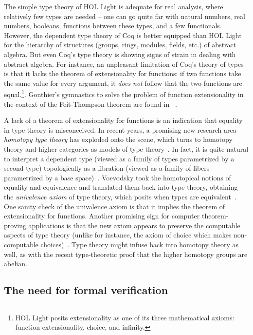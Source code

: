 \documentclass{llncs}
\begin{document}
The simple type theory of HOL Light is adequate for real
analysis, where relatively few types are needed -- one can go quite
far with natural numbers, real numbers, booleans, functions between
these types, and a few functionals.  However, the dependent type
theory of Coq is better equipped than HOL Light for the hierarchy of
structures (groups, rings, modules, fields, etc.) of abstract algebra.
But even Coq's type theory is showing signs of strain in dealing with
abstract algebra.  For instance, an unpleasant limitation of Coq's
theory of types is that it lacks the theorem of extensionality for
functions: if two functions take the same value for every argument, it
{\it does not} follow that the two functions are equal.\footnote{HOL Light
  posits extensionality as one of its three mathematical axioms: function extensionality, choice,
  and infinity.}.  Gonthier's gymnastics to solve the problem of
function extensionality in the context of the Feit-Thompson theorem
are found in ~\cite{XX}.

A lack of a theorem of extensionality for functions is an indication
that equality in type theory is misconceived.  In recent years, a
promising new research area {\it homotopy type theory} has exploded
onto the scene, which turns to homotopy theory and higher categories
as models of type theory~\cite{htt}.  In fact, it is quite natural to
interpret a dependent type (viewed as a family of types parametrized
by a second type) topologically as a fibration (viewed as a family of
fibers parametrized by a base space)~\cite{AW09}. Voevodsky took the
homotopical notions of equality and equivalence and translated them
back into type theory, obtaining the {\it univalence axiom} of type
theory, which posits when types are equivalent~\cite{VV11}.  One
sanity check of the univalence axiom is that it implies the theorem of
extensionality for functions.  Another promising sign for computer
theorem-proving applications is that the new axiom appears to preserve
the computable aspects of type theory (unlike for instance, the axiom
of choice which makes non-computable choices)~\cite{LH11}.  Type
theory might infuse back into homotopy theory as well, as with the
recent type-theoretic proof that the higher homotopy groups are
abelian.










\subsection{The need for formal verification}
\end{document}
